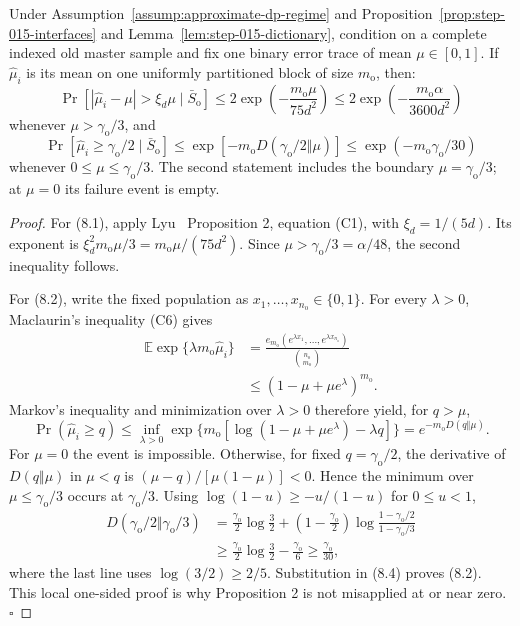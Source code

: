 \begin{lemma}\label{lem:step-015-tails}
Under Assumption~\ref{assump:approximate-dp-regime} and
Proposition~\ref{prop:step-015-interfaces} and
Lemma~\ref{lem:step-015-dictionary}, condition on a complete indexed old
master sample and fix one binary error trace of mean
\(\mu\in[0,1]\). If \(\widehat\mu_i\) is its mean on one uniformly
partitioned block of size \(m_{\mathrm o}\), then:
\[
\Pr\!\left[
|\widehat\mu_i-\mu|>\xi_d\mu\mid\bar S_{\mathrm o}
\right]
\le2\exp\!\left(-\frac{m_{\mathrm o}\mu}{75d^2}\right)
\le2\exp\!\left(-\frac{m_{\mathrm o}\alpha}{3600d^2}\right)
\tag{8.1}
\]
whenever \(\mu>\gamma_{\mathrm o}/3\), and
\[
\Pr[\widehat\mu_i\ge\gamma_{\mathrm o}/2\mid\bar S_{\mathrm o}]
\le\exp[-m_{\mathrm o}
D(\gamma_{\mathrm o}/2\Vert\mu)]
\le\exp(-m_{\mathrm o}\gamma_{\mathrm o}/30)
\tag{8.2}
\]
whenever \(0\le\mu\le\gamma_{\mathrm o}/3\). The second statement includes
the boundary \(\mu=\gamma_{\mathrm o}/3\); at \(\mu=0\) its failure event
is empty.


\end{lemma}

\begin{proof}
For (8.1), apply Lyu~\citep{lyu2025} Proposition 2, equation (C1), with
\(\xi_d=1/(5d)\). Its exponent is
\(\xi_d^2m_{\mathrm o}\mu/3=m_{\mathrm o}\mu/(75d^2)\).
Since
\(\mu>\gamma_{\mathrm o}/3=\alpha/48\), the second inequality follows.

For (8.2), write the fixed population as
\(x_1,\ldots,x_{n_{\mathrm o}}\in\{0,1\}\). For every \(\lambda>0\),
Maclaurin's inequality (C6) gives
\[
\begin{aligned}
\mathbb E\exp\{\lambda m_{\mathrm o}\widehat\mu_i\}
&=\frac{e_{m_{\mathrm o}}
(e^{\lambda x_1},\ldots,e^{\lambda x_{n_{\mathrm o}}})}
{\binom{n_{\mathrm o}}{m_{\mathrm o}}}\\
&\le(1-\mu+\mu e^\lambda)^{m_{\mathrm o}}.
\end{aligned}
\tag{8.3}
\]
Markov's inequality and minimization over \(\lambda>0\) therefore yield,
for \(q>\mu\),
\[
\Pr(\widehat\mu_i\ge q)
\le\inf_{\lambda>0}
\exp\{m_{\mathrm o}[\log(1-\mu+\mu e^\lambda)-\lambda q]\}
=e^{-m_{\mathrm o}D(q\Vert\mu)}.
\tag{8.4}
\]
For \(\mu=0\) the event is impossible. Otherwise, for fixed
\(q=\gamma_{\mathrm o}/2\), the derivative of
\(D(q\Vert\mu)\) in \(\mu<q\) is
\((\mu-q)/[\mu(1-\mu)]<0\). Hence the minimum over
\(\mu\le\gamma_{\mathrm o}/3\) occurs at \(\gamma_{\mathrm o}/3\).
Using \(\log(1-u)\ge-u/(1-u)\) for \(0\le u<1\),
\[
\begin{aligned}
D(\gamma_{\mathrm o}/2\Vert\gamma_{\mathrm o}/3)
&=\frac{\gamma_{\mathrm o}}2\log\frac32
+\left(1-\frac{\gamma_{\mathrm o}}2\right)
\log\frac{1-\gamma_{\mathrm o}/2}{1-\gamma_{\mathrm o}/3}\\
&\ge\frac{\gamma_{\mathrm o}}2\log\frac32
-\frac{\gamma_{\mathrm o}}6
\ge\frac{\gamma_{\mathrm o}}{30},
\end{aligned}
\tag{8.5}
\]
where the last line uses \(\log(3/2)\ge2/5\). Substitution in (8.4)
proves (8.2). This local one-sided proof is why Proposition 2 is not
misapplied at or near zero. \(\square\)


\end{proof}

